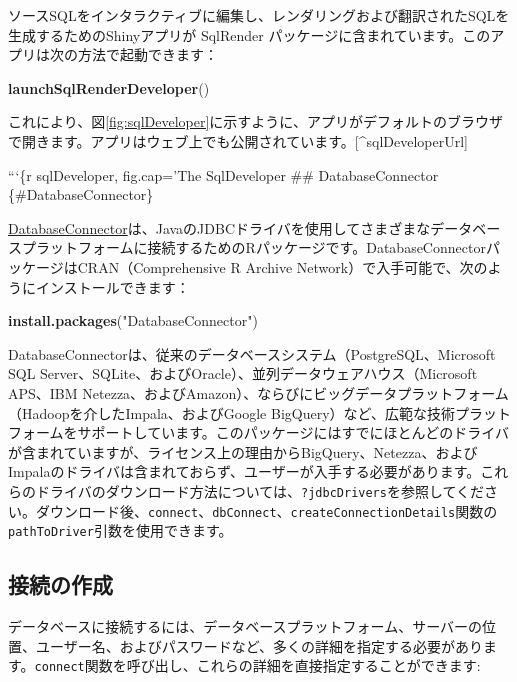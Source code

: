 \documentclass[
  11pt]{book}
\newenvironment{Shaded}{\begin{snugshade}}{\end{snugshade}}
\newcommand{\FunctionTok}[1]{\textcolor[rgb]{0.13,0.29,0.53}{\textbf{#1}}}
\newcommand{\NormalTok}[1]{#1}
\newcommand{\StringTok}[1]{\textcolor[rgb]{0.31,0.60,0.02}{#1}}
\theoremstyle{definition}
\theoremstyle{definition}
\theoremstyle{definition}
\theoremstyle{definition}
\theoremstyle{remark}
\begin{document}
ソースSQLをインタラクティブに編集し、レンダリングおよび翻訳されたSQLを生成するためのShinyアプリが SqlRender パッケージに含まれています。このアプリは次の方法で起動できます：

\begin{Shaded}
\begin{Highlighting}[]
\FunctionTok{launchSqlRenderDeveloper}\NormalTok{()}
\end{Highlighting}
\end{Shaded}

これにより、図\ref{fig:sqlDeveloper}に示すように、アプリがデフォルトのブラウザで開きます。アプリはウェブ上でも公開されています。{[}\^{}sqlDeveloperUrl{]}

```\{r sqlDeveloper, fig.cap='The SqlDeveloper
\#\# DatabaseConnector \{\#DatabaseConnector\}

\href{https://ohdsi.github.io/DatabaseConnector/}{DatabaseConnector}は、JavaのJDBCドライバを使用してさまざまなデータベースプラットフォームに接続するためのRパッケージです。DatabaseConnectorパッケージはCRAN（Comprehensive R Archive Network）で入手可能で、次のようにインストールできます：

\begin{Shaded}
\begin{Highlighting}[]
\FunctionTok{install.packages}\NormalTok{(}\StringTok{"DatabaseConnector"}\NormalTok{)}
\end{Highlighting}
\end{Shaded}

DatabaseConnectorは、従来のデータベースシステム（PostgreSQL、Microsoft SQL Server、SQLite、およびOracle）、並列データウェアハウス（Microsoft APS、IBM Netezza、およびAmazon）、ならびにビッグデータプラットフォーム（Hadoopを介したImpala、およびGoogle BigQuery）など、広範な技術プラットフォームをサポートしています。このパッケージにはすでにほとんどのドライバが含まれていますが、ライセンス上の理由からBigQuery、Netezza、およびImpalaのドライバは含まれておらず、ユーザーが入手する必要があります。これらのドライバのダウンロード方法については、\texttt{?jdbcDrivers}を参照してください。ダウンロード後、\texttt{connect}、\texttt{dbConnect}、\texttt{createConnectionDetails}関数の\texttt{pathToDriver}引数を使用できます。

\subsection{接続の作成}\label{ux63a5ux7d9aux306eux4f5cux6210}

データベースに接続するには、データベースプラットフォーム、サーバーの位置、ユーザー名、およびパスワードなど、多くの詳細を指定する必要があります。\texttt{connect}関数を呼び出し、これらの詳細を直接指定することができます: 
\end{document}
